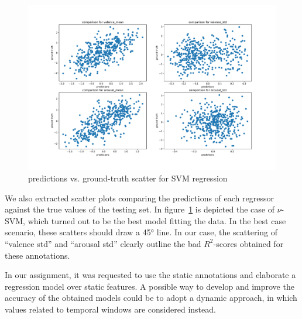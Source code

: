 \begin{figure}
	\centering
	\includegraphics[width=\linewidth]{assets/predictions-scatter.pdf}
	\caption{predictions vs. ground-truth scatter for SVM regression}
	\label{fig:eval-scatter}
\end{figure}

We also extracted scatter plots comparing the predictions of each regressor against the true values of the testing set. In  figure~\ref{fig:eval-scatter} is depicted the case of $\nu$-SVM, which turned out to be the best model fitting the data. In the best case scenario, these scatters should draw a 45° line. In our case, the scattering of ``valence std'' and ``arousal std'' clearly outline the bad $R^2$-scores obtained for these annotations.

In our assignment, it was requested to use the static annotations and elaborate a regression model over static features. A possible way to develop and improve the accuracy of the obtained models could be to adopt a dynamic approach, in which values related to temporal windows are considered instead.
